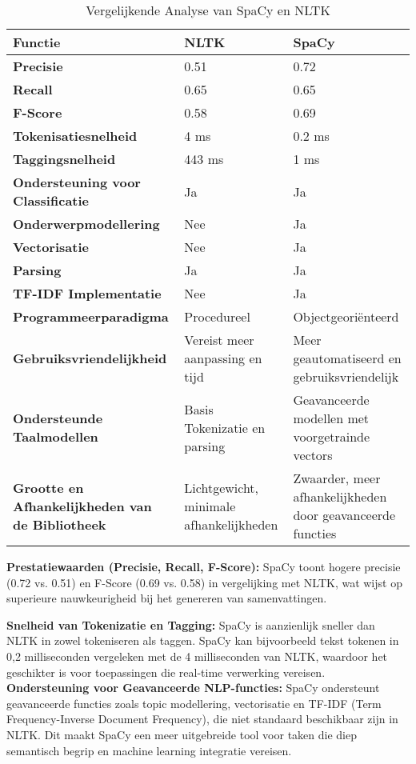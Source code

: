 \begin{table}[h!]
\centering
\caption{Vergelijkende Analyse van SpaCy en NLTK}
\label{tab:comparison}
\begin{tabular}{@{}|l|l|l|@{}}
\toprule
\textbf{Functie} & \textbf{NLTK} & \textbf{SpaCy} \\ \midrule
\textbf{Precisie} & 0.51 & 0.72 \\ \midrule
\textbf{Recall} & 0.65 & 0.65 \\ \midrule
\textbf{F-Score} & 0.58 & 0.69 \\ \midrule
\textbf{Tokenisatiesnelheid} & 4 ms & 0.2 ms \\ \midrule
\textbf{Taggingsnelheid} & 443 ms & 1 ms \\ \midrule
\textbf{Ondersteuning voor Classificatie} & Ja & Ja \\ \midrule
\textbf{Onderwerpmodellering} & Nee & Ja \\ \midrule
\textbf{Vectorisatie} & Nee & Ja \\ \midrule
\textbf{Parsing} & Ja & Ja \\ \midrule
\textbf{TF-IDF Implementatie} & Nee & Ja \\ \midrule
\textbf{Programmeerparadigma} & Procedureel & Objectgeoriënteerd \\ \midrule
\textbf{Gebruiksvriendelijkheid} & Vereist meer aanpassing en tijd & Meer geautomatiseerd en gebruiksvriendelijk \\ \midrule
\textbf{Ondersteunde Taalmodellen} & Basis Tokenizatie en parsing & Geavanceerde modellen met voorgetrainde vectors \\ \midrule
\textbf{Grootte en Afhankelijkheden van de Bibliotheek} & Lichtgewicht, minimale afhankelijkheden & Zwaarder, meer afhankelijkheden door geavanceerde functies \\ \bottomrule
\end{tabular}
\end{table}

\textbf{Prestatiewaarden (Precisie, Recall, F-Score):} SpaCy toont hogere precisie (0.72 vs. 0.51) en F-Score (0.69 vs. 0.58) in vergelijking met NLTK, wat wijst op superieure nauwkeurigheid bij het genereren van samenvattingen.

\textbf{Snelheid van Tokenizatie en Tagging:} SpaCy is aanzienlijk sneller dan NLTK in zowel tokeniseren als taggen. SpaCy kan bijvoorbeeld tekst tokenen in 0,2 milliseconden vergeleken met de 4 milliseconden van NLTK, waardoor het geschikter is voor toepassingen die real-time verwerking vereisen.
\textbf{Ondersteuning voor Geavanceerde NLP-functies:} SpaCy ondersteunt geavanceerde functies zoals topic modellering, vectorisatie en TF-IDF (Term Frequency-Inverse Document Frequency), die niet standaard beschikbaar zijn in NLTK. Dit maakt SpaCy een meer uitgebreide tool voor taken die diep semantisch begrip en machine learning integratie vereisen.

